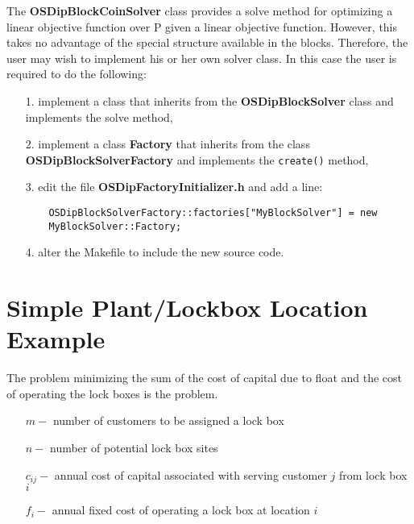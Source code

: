 \documentclass[11pt]{article}
\begin{document}
The {\bf OSDipBlockCoinSolver} class provides a solve method for optimizing a
linear objective function over {\cal P} given a linear objective function.
However, this takes no advantage of the special structure available in the
blocks. Therefore, the user may wish to implement his or her own solver class.
In this case the user is required to do the following:
 
 \begin{itemize}
   
   \item[1.] implement a class that inherits from the {\bf OSDipBlockSolver}
   class and implements the solve method,
   
   \item[2.] implement a class {\bf Factory} that inherits from the class {\bf
OSDipBlockSolverFactory} and implements the {\tt create()} method,

	\item[3.] edit the file {\bf OSDipFactoryInitializer.h} and add a line:
	
	\begin{verbatim}
	OSDipBlockSolverFactory::factories["MyBlockSolver"] = new
	MyBlockSolver::Factory;
	\end{verbatim}
   
   \item[4.] alter the Makefile to include the new source code.
 \end{itemize}
 
 
 
 \section{Simple Plant/Lockbox Location Example}


 The problem minimizing
the sum of the cost of capital due to float  and the cost of operating the lock boxes is the
 problem.  

\begin{itemize}
\item[]  $m -$ number of customers to be assigned a lock box

\item[]  $n -$ number of potential lock box sites

\item[]  $c_{ij} -$ annual cost of capital associated with serving customer $j$ from lock box $i$ 

\item[]  $f_{i} -$  annual fixed cost of operating a lock box at location $i$
\end{itemize}
\end{document}
